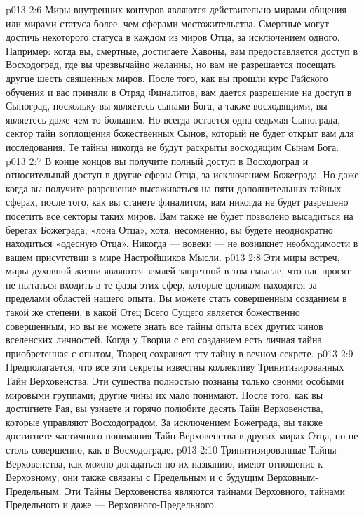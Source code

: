\vs p013 2:6 \pc Миры внутренних контуров являются действительно мирами общения или мирами статуса более, чем сферами местожительства. Смертные могут достичь некоторого статуса в каждом из миров Отца, за исключением одного. Например: когда вы, смертные, достигаете Хавоны, вам предоставляется доступ в Восходоград, где вы чрезвычайно желанны, но вам не разрешается посещать другие шесть священных миров. После того, как вы прошли курс Райского обучения и вас приняли в Отряд Финалитов, вам дается разрешение на доступ в Сыноград, поскольку вы являетесь сынами Бога, а также восходящими, вы являетесь даже чем\hyp{}то большим. Но всегда остается одна седьмая Сынограда, сектор тайн воплощения божественных Сынов, который не будет открыт вам для исследования. Те тайны никогда не будут раскрыты восходящим Сынам Бога.
\vs p013 2:7 В конце концов вы получите полный доступ в Восходоград и относительный доступ в другие сферы Отца, за исключением Божеграда. Но даже когда вы получите разрешение высаживаться на пяти дополнительных тайных сферах, после того, как вы станете финалитом, вам никогда не будет разрешено посетить все секторы таких миров. Вам также не будет позволено высадиться на берегах Божеграда, «лона Отца», хотя, несомненно, вы будете неоднократно находиться «одесную Отца». Никогда --- вовеки --- не возникнет необходимости в вашем присутствии в мире Настройщиков Мысли.
\vs p013 2:8 Эти миры встреч, миры духовной жизни являются землей запретной в том смысле, что нас просят не пытаться входить в те фазы этих сфер, которые целиком находятся за пределами областей нашего опыта. Вы можете стать совершенным созданием в такой же степени, в какой Отец Всего Сущего является божественно совершенным, но вы не можете знать все тайны опыта всех других чинов вселенских личностей. Когда у Творца с его созданием есть личная тайна приобретенная с опытом, Творец сохраняет эту тайну в вечном секрете.
\vs p013 2:9 \pc Предполагается, что все эти секреты известны коллективу Тринитизированных Тайн Верховенства. Эти существа полностью познаны только своими особыми мировыми группами; другие чины их мало понимают. После того, как вы достигнете Рая, вы узнаете и горячо полюбите десять Тайн Верховенства, которые управляют Восходоградом. За исключением Божеграда, вы также достигнете частичного понимания Тайн Верховенства в других мирах Отца, но не столь совершенно, как в Восходограде.
\vs p013 2:10 Тринитизированные Тайны Верховенства, как можно догадаться по их названию, имеют отношение к Верховному; они также связаны с Предельным и с будущим Верховным\hyp{}Предельным. Эти Тайны Верховенства являются тайнами Верховного, тайнами Предельного и даже --- Верховного\hyp{}Предельного.

